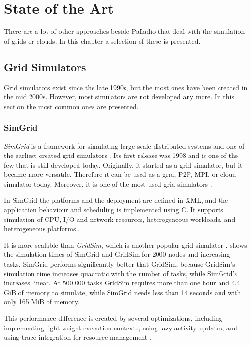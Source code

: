 \chapter{State of the Art}
\label{state}
There are a lot of other approaches beside Palladio that deal with the simulation of grids or clouds.
In this chapter a selection of these is presented.


\section{Grid Simulators}
Grid simulators exist since the late 1990s, but the most ones have been created in the mid 2000s. However, most simulators are not developed any more. In this section the most common ones are presented.

\subsection{SimGrid}
\label{simgrid}
\textit{SimGrid} is a framework for simulating large-scale distributed systems and one of the earliest created grid simulators \cite{simgrid_update}. Its first release was 1998 and is one of the few that is still developed today. Originally, it started as a grid simulator, but it became more versatile. Therefore it can be used as a grid, P2P, MPI, or cloud simulator today. Moreover, it is one of the most used grid simulators \cite{simgrid_update}.

In SimGrid the platforms and the deployment are defined in XML, and the application behaviour and scheduling is implemented using C. It supports simulation of CPU, I/O and network resources, heterogeneous workloads, and heterogeneous platforms \cite{simgrid_update}.

It is more scalable than \textit{GridSim}, which is another popular grid simulator \cite{simgrid_update}.
 shows the simulation times of SimGrid and GridSim for 2000 nodes and increasing tasks.
SimGrid performs significantly better that GridSim, because GridSim's simulation time increases quadratic with the number of tasks, while SimGrid's increases linear. At 500.000 tasks GridSim requires more than one hour and 4.4 GiB of memory to simulate, while SimGrid needs less than 14 seconds and with only 165 MiB of memory.

This performance difference is created by several optimizations, including implementing light-weight execution contexts, using lazy activity updates, and using trace integration for resource management \cite{simgrid_update}.
\newpage

